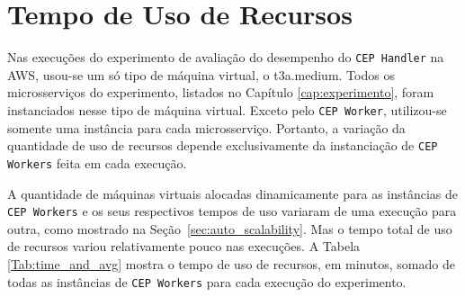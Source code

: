 
\section{Tempo de Uso de Recursos}
\label{sec:resource_usage_time}



Nas execuções do experimento de avaliação do desempenho do \texttt{CEP Handler} na AWS, usou-se um só tipo de máquina virtual, o t3a.medium. Todos os microsserviços do experimento, listados no Capítulo \ref{cap:experimento}, foram instanciados nesse tipo de máquina virtual. Exceto pelo \texttt{CEP Worker}, utilizou-se somente uma instância para cada microsserviço. Portanto, a variação da quantidade de uso de recursos depende exclusivamente da instanciação de \texttt{CEP Workers} feita em cada execução.

A quantidade de máquinas virtuais alocadas dinamicamente para as instâncias de \texttt{CEP Workers} e os seus respectivos tempos de uso variaram de uma execução para outra, como mostrado na Seção~\ref{sec:auto_scalability}.
Mas o tempo total de uso de recursos variou relativamente pouco nas execuções.
A Tabela \ref{Tab:time_and_avg} mostra o tempo de uso de recursos, em minutos, somado de todas as instâncias de \texttt{CEP Workers} para cada execução do experimento. 


